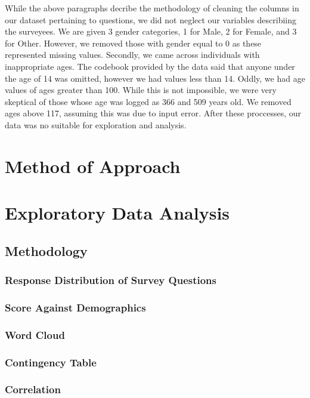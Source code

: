 \documentclass{article}
\begin{document}
While the above paragraphs decribe the methodology of cleaning the columns in our dataset pertaining to questions, we did not neglect our variables describiing the surveyees. We are given 3 gender categories, 1 for Male, 2 for Female, and 3 for Other. However, we removed those with gender equal to 0 as these represented missing values. Secondly, we came across individuals with inappropriate ages. The codebook provided by the data said that anyone under the age of 14 was omitted, however we had values less than 14. Oddly, we had age values of ages greater than 100. While this is not impossible, we were very skeptical of those whose age was logged as 366 and 509 years old. We removed ages above 117, assuming this was due to input error. After these proccesses, our data was no suitable for exploration and analysis. \\

\section{Method of Approach}

\newpage
\section{Exploratory Data Analysis}

\subsection{Methodology}

\subsubsection{Response Distribution of Survey Questions}

\subsubsection{Score Against Demographics}

\subsubsection{Word Cloud}

\subsubsection{Contingency Table}

\subsubsection{Correlation}
\end{document}
